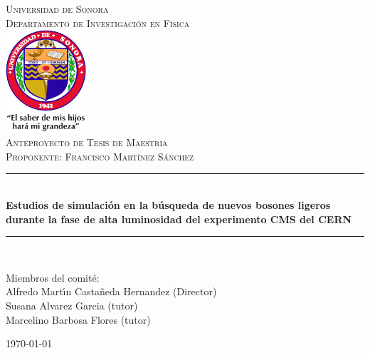 \newcommand{\HRule}{\rule{\linewidth}{0.5mm}} 

\begin{titlepage}
\center
\textsc{
\Huge{Universidad de Sonora}\\[.5cm]
\Large
Departamento de Investigaci\'on en F\'{\i}sica\\[1cm] 
\includegraphics[width=3cm]{unison}\\[3cm]
Anteproyecto de Tesis de Maestria \\[.7cm] 
Proponente: Francisco Mart\'{\i}nez S\'anchez}\\[.7cm] 

\sffamily
\HRule \\[0.4cm]
\textbf{\LARGE Estudios de simulación en la búsqueda de nuevos
bosones ligeros durante la fase de alta luminosidad del
experimento CMS del CERN}\\[0.2cm] 
\HRule \\[3cm]
 
\large
\begin{minipage}[t]{.6\textwidth}
\begin{flushleft}
Miembros del comit\'e:
\\
Alfredo Mart\'{\i}n Casta\~neda Hernandez (Director)\\
Susana Alvarez Garcia (tutor)\\
Marcelino Barbosa Flores (tutor)\\
\end{flushleft}

\end{minipage}\hfill




{\today}\\[3cm]

\end{titlepage}


